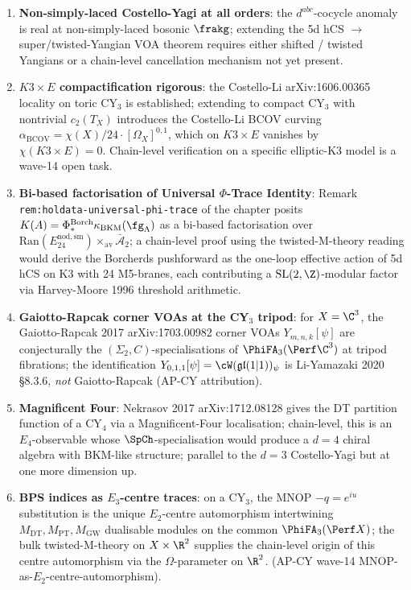 \begin{enumerate}
\item \textbf{Non-simply-laced Costello-Yagi at all orders}: the
$d^{abc}$-cocycle anomaly is real at non-simply-laced bosonic $\frakg$;
extending the 5d hCS $\to$ super/twisted-Yangian VOA theorem requires
either shifted / twisted Yangians or a chain-level cancellation
mechanism not yet present.
\item \textbf{$K3 \times E$ compactification rigorous}: the
Costello-Li arXiv:1606.00365 locality on toric CY$_3$ is established;
extending to compact CY$_3$ with nontrivial $c_2(T_X)$ introduces the
Costello-Li BCOV curving $\alpha_{\mathrm{BCOV}} = \chi(X)/24 \cdot
[\Omega_X]^{0,1}$, which on $K3 \times E$ vanishes by
$\chi(K3 \times E) = 0$. Chain-level verification on a specific
elliptic-K3 model is a wave-14 open task.
\item \textbf{Bi-based factorisation of Universal $\Phi$-Trace Identity}:
Remark \texttt{rem:holdata-universal-phi-trace} of the chapter posits
$K(A) = \Phi^{\mathrm{Borch}}_* \kappa_{\mathrm{BKM}}(\fg_\Lambda)$
as a bi-based factorisation over $\mathrm{Ran}(E_{24}^{\mathrm{nod,sm}})
\times_{\mathrm{av}} \bar{\mathcal{A}}_2$; a chain-level proof using
the twisted-M-theory reading would derive the Borcherds pushforward as
the one-loop effective action of 5d hCS on K3 with 24 M5-branes, each
contributing a $\mathrm{SL}(2, \Z)$-modular factor via
Harvey-Moore 1996 threshold arithmetic.
\item \textbf{Gaiotto-Rapcak corner VOAs at the CY$_3$ tripod}: for
$X = \C^3$, the Gaiotto-Rapcak 2017 arXiv:1703.00982 corner VOAs
$Y_{m, n, k}[\psi]$ are conjecturally the $(\Sigma_2, C)$-specialisations
of $\PhiFA_3(\Perf \C^3)$ at tripod fibrations; the identification
$Y_{0, 1, 1}[\psi] = \cW(\mathfrak{gl}(1|1))_\psi$ is Li-Yamazaki 2020
\S8.3.6, \emph{not} Gaiotto-Rapcak (AP-CY attribution).
\item \textbf{Magnificent Four}: Nekrasov 2017 arXiv:1712.08128 gives
the DT partition function of a CY$_4$ via a Magnificent-Four localisation;
chain-level, this is an $E_4$-observable whose
$\SpCh$-specialisation would produce a $d = 4$ chiral algebra with
BKM-like structure; parallel to the $d = 3$ Costello-Yagi but at
one more dimension up.
\item \textbf{BPS indices as $E_3$-centre traces}: on a CY$_3$, the
MNOP $-q = e^{iu}$ substitution is the unique $E_2$-centre automorphism
intertwining $M_{\mathrm{DT}}, M_{\mathrm{PT}}, M_{\mathrm{GW}}$
dualisable modules on the common $\PhiFA_3(\Perf X)$; the bulk
twisted-M-theory on $X \times \R^2$ supplies the chain-level origin of
this centre automorphism via the $\Omega$-parameter on $\R^2$.
(AP-CY wave-14 MNOP-as-$E_2$-centre-automorphism).
\end{enumerate}

